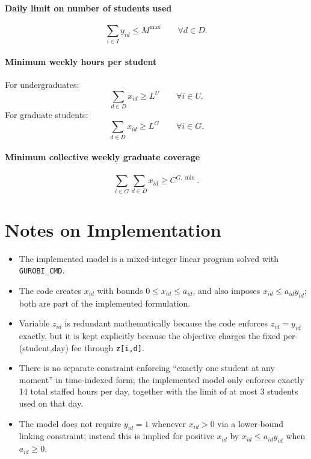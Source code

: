 \paragraph{Daily limit on number of students used}
\[
\sum_{i\in I} y_{id} \le M^{\max}
\qquad \forall d\in D.
\]

\paragraph{Minimum weekly hours per student}
For undergraduates:
\[
\sum_{d\in D} x_{id} \ge L^{U}
\qquad \forall i\in U.
\]
For graduate students:
\[
\sum_{d\in D} x_{id} \ge L^{G}
\qquad \forall i\in G.
\]

\paragraph{Minimum collective weekly graduate coverage}
\[
\sum_{i\in G}\sum_{d\in D} x_{id} \ge C^{G,\min}.
\]

\section*{Notes on Implementation}

\begin{itemize}
    \item The implemented model is a mixed-integer linear program solved with \texttt{GUROBI\_CMD}.
    \item The code creates $x_{id}$ with bounds $0 \le x_{id} \le a_{id}$, and also imposes $x_{id}\le a_{id}y_{id}$; both are part of the implemented formulation.
    \item Variable $z_{id}$ is redundant mathematically because the code enforces $z_{id}=y_{id}$ exactly, but it is kept explicitly because the objective charges the fixed per-(student,day) fee through \texttt{z[i,d]}.
    \item There is no separate constraint enforcing “exactly one student at any moment” in time-indexed form; the implemented model only enforces exactly 14 total staffed hours per day, together with the limit of at most 3 students used on that day.
    \item The model does not require $y_{id}=1$ whenever $x_{id}>0$ via a lower-bound linking constraint; instead this is implied for positive $x_{id}$ by $x_{id}\le a_{id}y_{id}$ when $a_{id}\ge 0$.
\end{itemize}
